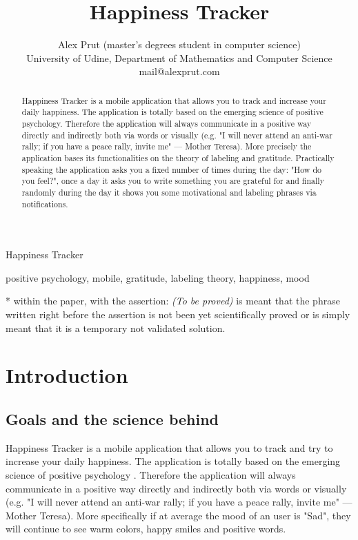 \documentclass[times]{jtitauth}
\begin{document}
\title{Happiness Tracker\\}

\author{Alex Prut (master's degrees student in computer science) \\
University of Udine, Department of Mathematics and Computer Science \\ mail@alexprut.com}

{Happiness Tracker}

\maketitle

\begin{abstract}
Happiness Tracker is a mobile application that allows you to track and increase your daily happiness.
The application is totally based on the emerging science of positive psychology. Therefore
the application will always communicate in a positive way directly and indirectly
both via words or visually (e.g. "I will never attend an anti-war rally; if you have a peace rally, invite me" — Mother Teresa).
More precisely the application bases its functionalities on the theory of labeling and gratitude.
Practically speaking the application asks you a fixed number of times during the day: "How do you feel?",
once a day it asks you to write something you are grateful for and finally
randomly during the day it shows you some motivational and
labeling phrases via notifications.
\end {abstract}

\begin{keywords}
positive psychology, mobile, gratitude, labeling theory, happiness, mood
\end{keywords}

* within the paper, with the assertion: \textit{(To be proved)} is meant that the phrase written right before the assertion is not been yet scientifically proved or is simply meant that it is a temporary not validated solution.

\section{Introduction}

\subsection{Goals and the science behind}
Happiness Tracker is a mobile application that allows you to track and try to increase your daily happiness.
The application is totally based on the emerging science of positive psychology \cite{1,2}. Therefore
the application will always communicate in a positive way directly and indirectly
both via words or visually (e.g. "I will never attend an anti-war rally; if you have a peace rally, invite me" — Mother Teresa).
More specifically if at average the mood of an user is "Sad", they will
continue to see warm colors, happy smiles and positive words.
\end{document}
